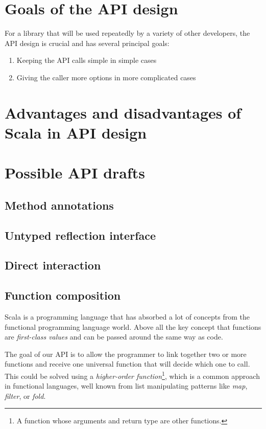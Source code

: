 \section{Goals of the API design}

For a library that will be used repeatedly by a variety of other developers, the API design is crucial and has several principal goals:

\begin{enumerate}
	\item Keeping the API calls simple in simple cases
	\item Giving the caller more options in more complicated cases
\end{enumerate}

\section{Advantages and disadvantages of Scala in API design}


\section{Possible API drafts}

\subsection{Method annotations}

\subsection{Untyped reflection interface}

\subsection{Direct interaction}

\subsection{Function composition}

Scala is a programming language that has absorbed a lot of concepts from the functional programming language world. Above all the key concept that functions are \textit{first-class values} and can be passed around the same way as code.

The goal of our API is to allow the programmer to link together two or more functions and receive one universal function that will decide which one to call. This could be solved using a \textit{higher-order function}\footnote{A function whose arguments and return type are other functions.}, which is a common approach in functional languages, well known from list manipulating patterns like \textit{map}, \textit{filter}, or \textit{fold}.


